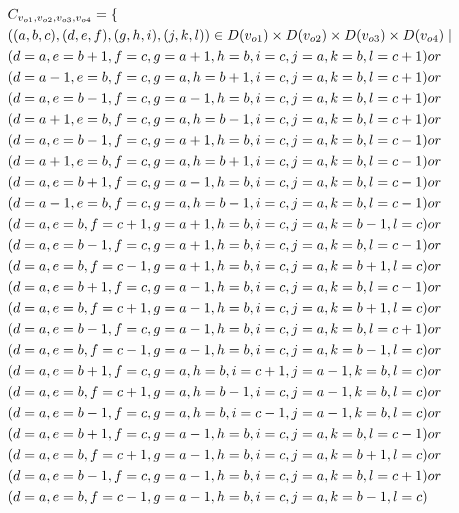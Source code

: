 \begin{align*}
&C_{v_{o1},v_{o2},v_{o3},v_{o4}}=\{\\
&((a,b,c),(d,e,f),(g,h,i),(j,k,l))\in D(v_{o1}) \times D(v_{o2})\times D(v_{o3})\times D(v_{o4})\mid\\
&(d=a ,e=b+1,f=c , g=a+1,h=b ,i=c ,j=a ,k=b ,l=c+1)or\\
&(d=a-1,e=b ,f=c , g=a ,h=b+1,i=c ,j=a ,k=b ,l=c+1)or\\
&(d=a ,e=b-1,f=c , g=a-1,h=b ,i=c ,j=a ,k=b ,l=c+1)or\\
&(d=a+1,e=b ,f=c , g=a ,h=b-1,i=c ,j=a ,k=b ,l=c+1)or\\
&(d=a ,e=b-1,f=c , g=a+1,h=b ,i=c ,j=a ,k=b ,l=c-1)or\\
&(d=a+1,e=b ,f=c , g=a ,h=b+1,i=c ,j=a ,k=b ,l=c-1)or\\
&(d=a ,e=b+1,f=c , g=a-1,h=b ,i=c ,j=a ,k=b ,l=c-1)or\\
&(d=a-1,e=b ,f=c , g=a ,h=b-1,i=c ,j=a ,k=b ,l=c-1)or\\
&(d=a ,e=b ,f=c+1, g=a+1,h=b ,i=c ,j=a ,k=b-1,l=c )or\\
&(d=a ,e=b-1,f=c , g=a+1,h=b ,i=c ,j=a ,k=b ,l=c-1)or\\
&(d=a ,e=b ,f=c-1, g=a+1,h=b ,i=c ,j=a ,k=b+1,l=c )or\\
&(d=a ,e=b+1,f=c , g=a-1,h=b ,i=c ,j=a ,k=b ,l=c-1)or\\
&(d=a ,e=b ,f=c+1, g=a-1,h=b ,i=c ,j=a ,k=b+1,l=c )or\\
&(d=a ,e=b-1,f=c , g=a-1,h=b ,i=c ,j=a ,k=b ,l=c+1)or\\
&(d=a ,e=b ,f=c-1, g=a-1,h=b ,i=c ,j=a ,k=b-1,l=c )or\\
&(d=a ,e=b+1,f=c , g=a ,h=b ,i=c+1,j=a-1,k=b ,l=c )or\\
&(d=a ,e=b ,f=c+1, g=a ,h=b-1,i=c ,j=a-1,k=b ,l=c )or\\
&(d=a ,e=b-1,f=c , g=a ,h=b ,i=c-1,j=a-1,k=b ,l=c )or\\
&(d=a ,e=b+1,f=c , g=a-1,h=b ,i=c ,j=a ,k=b ,l=c-1)or\\
&(d=a ,e=b ,f=c+1, g=a-1,h=b ,i=c ,j=a ,k=b+1,l=c )or\\
&(d=a ,e=b-1,f=c , g=a-1,h=b ,i=c ,j=a ,k=b ,l=c+1)or\\
&(d=a ,e=b ,f=c-1, g=a-1,h=b ,i=c ,j=a ,k=b-1,l=c )
\end{align*}
